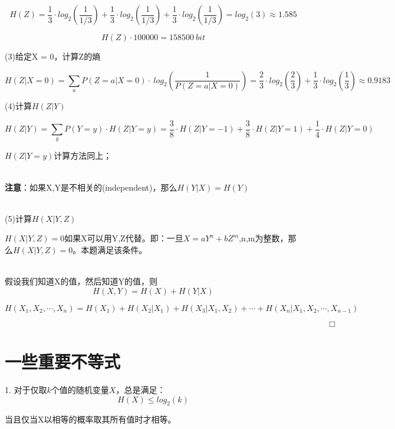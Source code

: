 \documentclass{article}
\begin{document}
$$H(Z) = \frac{1}{3} \cdot log_2(\frac{1}{1/3})+\frac{1}{3} \cdot log_2(\frac{1}{1/3})+\frac{1}{3} \cdot log_2(\frac{1}{1/3})= log_2(3) \approx 1.585$$


$$H(Z) \cdot 100000 =158500 \ bit $$

(3)给定X = 0，计算Z的熵

$$H(Z|X=0)=\sum_a P(Z=a|X=0) \cdot \ log_2(\frac{1}{P(Z=a|X=0)})=\frac{2}{3}\cdot log_2(\frac{2}{3})+\frac{1}{3}\cdot log_2(\frac{1}{3}) \approx 0.9183$$

(4)计算$H(Z|Y)$

$$H(Z|Y) = \sum_y P(Y=y) \cdot H(Z|Y=y)=\frac{3}{8} \cdot H(Z|Y=-1)+\frac{3}{8} \cdot H(Z|Y=1)+\frac{1}{4}\cdot H(Z|Y=0)$$

$H(Z|Y=y)$计算方法同上；

~\\

\textbf{注意}：如果X,Y是不相关的(independent)，那么$H(Y|X)=H(Y)$

~\\

(5)计算$H(X|Y,Z)$

$H(X|Y,Z) = 0$如果X可以用Y,Z代替。即：一旦$X=aY^n+bZ^m$,n,m为整数，那么$H(X|Y,Z) = 0$。本题满足该条件。





~\\

假设我们知道X的值，然后知道Y的值，则
$$H(X,Y) = H(X)+H(Y|X)$$

$$H(X_1,X_2,\cdots,X_n) = H(X_1)+H(X_2|X_1)+H(X_3|X_1,X_2)+\cdots+H(X_n|X_1,X_2,\cdots,X_{n-1})$$

\href{http://www.cs.tau.ac.il/~iftachh/Courses/Info/Fall14/Printouts/Lesson2_h.pdf}{\color{blue}{证明过程请参考这里}}

$\quad\quad\quad\quad\quad\quad\quad\quad\quad\quad\quad\quad\quad\quad\quad\quad\quad\quad\quad\quad\quad\quad\quad\quad\quad\quad\quad\quad\quad\quad\quad\quad\quad\quad\quad\quad\quad\quad\quad\Box$

\section*{一些重要不等式}

1. 对于仅取$k$个值的随机变量$X$，总是满足：
$$H(X) \leq log_2(k)$$

当且仅当X以相等的概率取其所有值时才相等。

~\\
\end{document}
